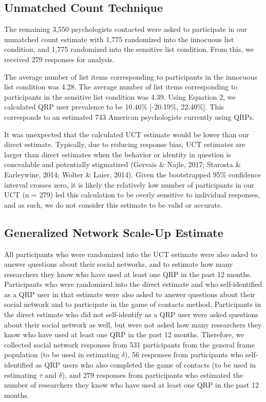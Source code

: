 \documentclass[jou]{apa6}
\theoremstyle{definition}
\theoremstyle{definition}
\theoremstyle{definition}
\theoremstyle{remark}
\begin{document}
\subsection{Unmatched Count
Technique}\label{unmatched-count-technique-1}

The remaining 3,550 psychologists contacted were asked to participate in
our unmatched count estimate with 1,775 randomized into the innocuous
list condition, and 1,775 randomized into the sensitive list condition.
From this, we received 279 responses for analysis.

The average number of list items corresponding to participants in the
innocuous list condition was 4.28. The average number of list items
corresponding to participants in the sensitive list condition was 4.39.
Using Equation 2, we calculated QRP user prevalence to be 10.46\%
{[}-20.19\%, 22.40\%{]}. This corresponds to an estimated 743 American
psychologists currently using QRPs.

It was unexpected that the calculated UCT estimate would be lower than
our direct estimate. Typically, due to reducing response bias, UCT
estimates are larger than direct estimates when the behavior or identity
in question is concealable and potentially stigmatized (Gervais \&
Najle, 2017; Starosta \& Earleywine, 2014; Wolter \& Laier, 2014). Given
the bootstrapped 95\% confidence interval crosses zero, it is likely the
relatively low number of participants in our UCT (n = 279) led this
calculation to be overly sensitive to individual responses, and as such,
we do not consider this estimate to be valid or accurate.

\subsection{Generalized Network Scale-Up
Estimate}\label{generalized-network-scale-up-estimate}

All participants who were randomized into the UCT estimate were also
asked to answer questions about their social networks, and to estimate
how many researchers they know who have used at least one QRP in the
past 12 months. Participants who were randomized into the direct
estimate and who self-identified as a QRP user in that estimate were
also asked to answer questions about their social network and to
participate in the game of contacts method. Participants in the direct
estimate who did not self-identify as a QRP user were asked questions
about their social network as well, but were not asked how many
researchers they know who have used at least one QRP in the past 12
months. Therefore, we collected social network responses from 531
participants from the general frame population (to be used in estimating
\(\delta\)), 56 responses from participants who self-identified as QRP
users who also completed the game of contacts (to be used in estimating
\(\tau\) and \(\delta\)), and 279 responses from participants who
estimated the number of researchers they know who have used at least one
QRP in the past 12 months.
\end{document}
